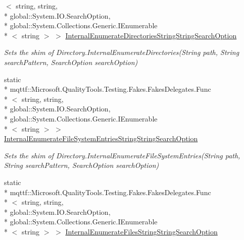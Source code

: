 \begin{DoxyCompactItemize}
$<$ string, string, \\*
global\-::\-System.\-I\-O.\-Search\-Option, \\*
global\-::\-System.\-Collections.\-Generic.\-I\-Enumerable\\*
$<$ string $>$ $>$ \hyperlink{class_system_1_1_i_o_1_1_fakes_1_1_shim_directory_a9d98402175d34acb2dd162133bca3d16}{Internal\-Enumerate\-Directories\-String\-String\-Search\-Option}
\begin{DoxyCompactList}\small\item\em Sets the shim of Directory.\-Internal\-Enumerate\-Directories(\-String path, String search\-Pattern, Search\-Option search\-Option)\end{DoxyCompactList}\item 
static \\*
mqttf\-::\-Microsoft.\-Quality\-Tools.\-Testing.\-Fakes.\-Fakes\-Delegates.\-Func\\*
$<$ string, string, \\*
global\-::\-System.\-I\-O.\-Search\-Option, \\*
global\-::\-System.\-Collections.\-Generic.\-I\-Enumerable\\*
$<$ string $>$ $>$ \hyperlink{class_system_1_1_i_o_1_1_fakes_1_1_shim_directory_ac6cf2147847bee1736b17d6ecc8e6d5a}{Internal\-Enumerate\-File\-System\-Entries\-String\-String\-Search\-Option}
\begin{DoxyCompactList}\small\item\em Sets the shim of Directory.\-Internal\-Enumerate\-File\-System\-Entries(\-String path, String search\-Pattern, Search\-Option search\-Option)\end{DoxyCompactList}\item 
static \\*
mqttf\-::\-Microsoft.\-Quality\-Tools.\-Testing.\-Fakes.\-Fakes\-Delegates.\-Func\\*
$<$ string, string, \\*
global\-::\-System.\-I\-O.\-Search\-Option, \\*
global\-::\-System.\-Collections.\-Generic.\-I\-Enumerable\\*
$<$ string $>$ $>$ \hyperlink{class_system_1_1_i_o_1_1_fakes_1_1_shim_directory_a8c9a58e3a0ee02c099de76a06796cb27}{Internal\-Enumerate\-Files\-String\-String\-Search\-Option}

\end{DoxyCompactItemize}
